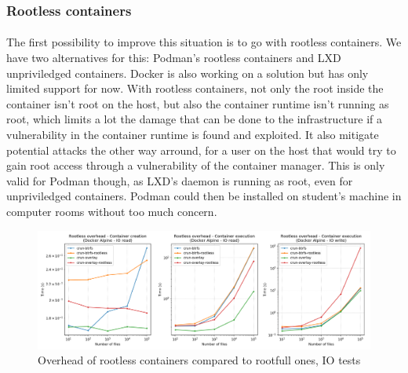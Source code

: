 \subsubsection{Rootless containers}
\paragraph{}The first possibility to improve this situation is to go with rootless containers.  We have two alternatives for this: Podman's rootless containers and LXD unpriviledged containers.  Docker is also working on a solution but has only limited support for now.  With rootless containers, not only the root inside the container isn't root on the host, but also the container runtime isn't running as root, which limits a lot the damage that can be done to the infrastructure if a vulnerability in the container runtime is found and exploited.  It also mitigate potential attacks the other way arround, for a user on the host that would try to gain root access through a vulnerability of the container manager.  This is only valid for Podman though, as LXD's daemon is running as root, even for unpriviledged containers.  Podman could then be installed on student's machine in computer rooms without too much concern.

\begin{figure}[h!]
  \begin{center}
    \includegraphics[width=\linewidth]{images/question-3-rootless-io.png}
    \caption{Overhead of rootless containers compared to rootfull ones, IO tests}
    \label{fig:q3:rootless:io}
  \end{center}
\end{figure}

